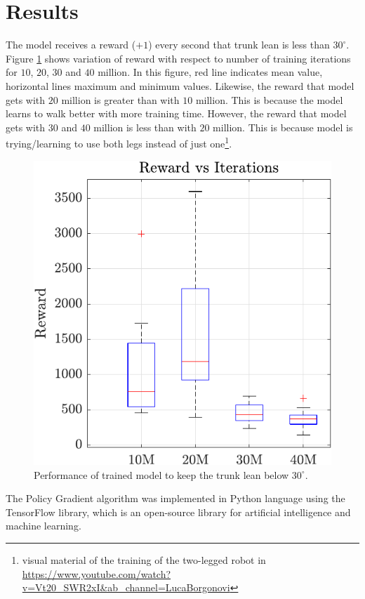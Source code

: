 \section{Results}
The model receives a reward ($+1$) every second that trunk lean is less than $30^{\circ}$. Figure \ref{fig:boxplot} shows variation of reward with respect to number of training iterations for $10$, $20$, $30$ and $40$ million. In this figure, red line indicates mean value, horizontal lines maximum and minimum values. Likewise, the reward that model gets with $20$ million is greater than with $10$ million. This is because the model learns to walk better with more training time. However, the reward that model gets with $30$ and $40$ million is less than with $20$ million. This is because model is trying/learning to use both legs instead of just one\footnote{visual material of the training of the two-legged robot in \url{https://www.youtube.com/watch?v=Vt20_SWR2xI&ab_channel=LucaBorgonovi}}.

\begin{figure}
	\centering
	\includegraphics{images/reward_vs_iter.pdf}
	\caption{Performance of trained model to keep the trunk lean below $30^{\circ}$.}
	\label{fig:boxplot}
\end{figure}

The Policy Gradient algorithm was implemented in Python language using the TensorFlow library, which is an open-source library for artificial intelligence and machine learning.

